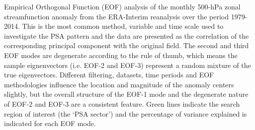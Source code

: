 \label{fig:eof}
Empirical Orthogonal Function (EOF) analysis of the monthly 500-hPa zonal streamfunction anomaly from the ERA-Interim reanalysis over the period 1979-2014. This is the most common method, variable and time scale used to investigate the PSA pattern and the data are presented as the correlation of the corresponding principal component with the original field.  The second and third EOF modes are degenerate according to the \citet{North1982} rule of thumb, which means the sample eignenvectors (i.e. EOF-2 and EOF-3) represent a random mixture of the true eigenvectors. Different filtering, datasets, time periods and EOF methodologies influence the location and magnitude of the anomaly centers slightly, but the overall structure of the EOF-1 mode and the degenerate nature of EOF-2 and EOF-3 are a consistent feature. Green lines indicate the search region of interest (the `PSA sector') and the percentage of variance explained is indicated for each EOF mode.